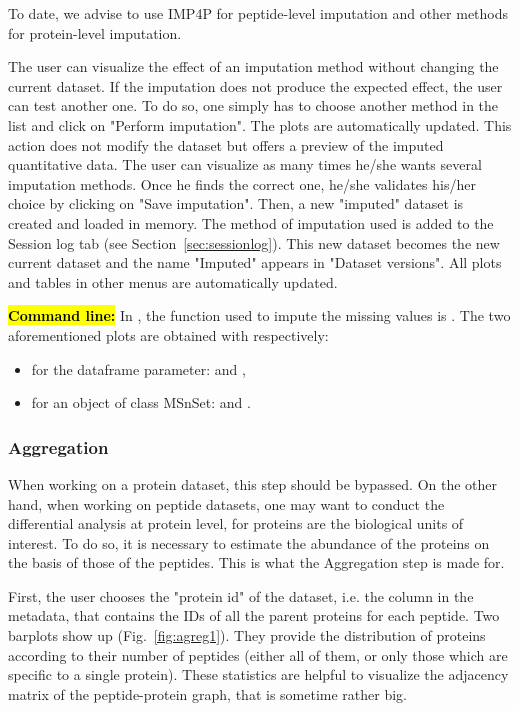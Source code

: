 \documentclass[12pt]{article}
\begin{document}
{To date, we advise to use IMP4P for peptide-level imputation and other methods for protein-level
imputation.


The user can visualize the effect of an imputation method without changing 
the current dataset. If the imputation does not produce the expected effect, 
the user can test another one. To do so, one simply has to choose another 
method in the list and click on "Perform imputation". The plots are 
automatically updated. This action does not modify the dataset but offers a 
preview of the imputed quantitative data.
The user can visualize as many times he/she wants several imputation methods. 
Once he finds the correct one, he/she validates his/her choice by clicking on 
"Save imputation". Then, a new "imputed" dataset is created and loaded in 
memory. The method of imputation used is added to the Session log tab (see 
Section~\ref{sec:sessionlog}). This new dataset becomes the new current 
dataset and the name "Imputed" appears in "Dataset versions". All plots and 
tables in other menus are automatically updated.

{\hl{\bf Command line:} In , the function used to impute the 
missing values is . The two aforementioned plots 
are obtained with respectively:
\begin{itemize}
\item for the dataframe parameter:  and 
,
\item for an object of class MSnSet:  and 
.
\end{itemize}}

\subsubsection{Aggregation}\label{aggregation}


When working on a protein dataset, this step should be bypassed. On the other 
hand, when working on peptide datasets, one may want to conduct the 
differential analysis at protein level, for proteins are the biological units 
of interest. To do so, it is necessary to estimate the abundance of the 
proteins on the basis of those of the peptides. This is what the Aggregation 
step is made for.

First, the user chooses the "protein id" of the dataset, i.e. the column in 
the metadata, that contains the IDs of all the parent proteins for each 
peptide. 
Two barplots show up (Fig.~\ref{fig:agreg1}). They provide the distribution 
of proteins according to their number of peptides (either all of them, or 
only those which are specific to a single protein). These statistics are 
helpful to visualize the adjacency matrix of the peptide-protein graph, that 
is sometime rather big.


}
\end{document}

